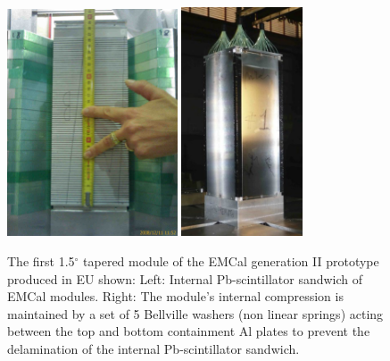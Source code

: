 %


\begin{figure}[ht]
\begin{center}
\includegraphics[width=0.45\textwidth]{figures/open-module.jpg}
\includegraphics[width=0.32\textwidth]{figures/emc-module.jpg}
\end{center}
\caption{\label{fig:module} The first 1.5$^\circ$ tapered module of the EMCal generation II prototype produced in EU shown: Left: Internal Pb-scintillator sandwich of EMCal modules. Right: The module's internal compression is maintained by a set of 5 Bellville washers (non linear springs) acting between the top and bottom containment 
Al plates to prevent the delamination of the internal Pb-scintillator sandwich.
}
\end{figure}


